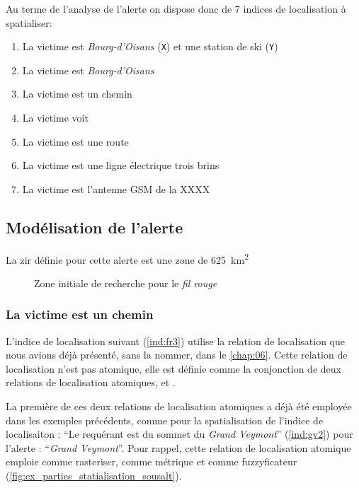 Au terme de l'analyse de l'alerte on dispose donc de 7 indices de
localisation à spatialiser:
% 
\begin{enumerate}
\item \label{ind:fr1} La victime est
  \emph{Bourg-d'Oisans} (\texttt{X}) et une station de ski
  (\texttt{Y})
\item \label{ind:fr2} La victime est
   \emph{Bourg-d'Oisans} 
\item \label{ind:fr3} La victime est  un
  chemin
\item \label{ind:fr4} La victime voit
\item \label{ind:fr5} La victime est  une
  route
\item \label{ind:fr6} La victime est  une
  ligne électrique trois brins
\item \label{ind:fr7} La victime est 
  l'antenne GSM de la XXXX
\end{enumerate}

\subsection{Modélisation de l'alerte}
\label{subsec:9-4-2}

La \ac{zir} définie pour cette alerte est une zone de
\SI{625}{\kilo\meter\squared}

\begin{figure}
  \centering
  
  \caption{Zone initiale de recherche pour le \emph{fil rouge}}
  \label{fig:zir_fil_rouge}
\end{figure}

\subsubsection{La victime est \protect{} un chemin}

L'indice de localisation suivant (\ref{ind:fr3}) utilise la relation
de localisation  que nous avions déjà
présenté, sans la nommer, dans le \autoref{chap:06}. Cette relation de
localisation n'est pas atomique, elle est définie comme la conjonction
de deux relations de localisation atomiques,
 et .

La première de ces deux relations de localisation atomiques
 a déjà été employée dans les exemples
précédents, comme pour la spatialisation de l'indice de localisaiton :
\enquote{Le requérant est  du sommet du
  \emph{Grand Veymont}} (\ref{ind:gv2}) pour l'alerte :
\enquote{\emph{Grand Veymont}}. Pour rappel, cette relation de
localisation atomique emploie  comme rasteriser,
 comme métrique et
 comme fuzzyficateur
(\autoref{fig:ex_parties_statialisation_sousalt}).

